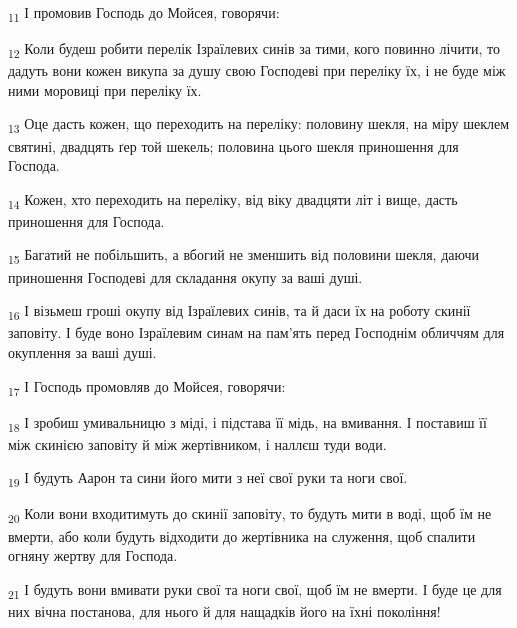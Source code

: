 \begin{tcolorbox}
\textsubscript{11} І промовив Господь до Мойсея, говорячи:
\end{tcolorbox}
\begin{tcolorbox}
\textsubscript{12} Коли будеш робити перелік Ізраїлевих синів за тими, кого повинно лічити, то дадуть вони кожен викупа за душу свою Господеві при переліку їх, і не буде між ними моровиці при переліку їх.
\end{tcolorbox}
\begin{tcolorbox}
\textsubscript{13} Оце дасть кожен, що переходить на переліку: половину шекля, на міру шеклем святині, двадцять ґер той шекель; половина цього шекля приношення для Господа.
\end{tcolorbox}
\begin{tcolorbox}
\textsubscript{14} Кожен, хто переходить на переліку, від віку двадцяти літ і вище, дасть приношення для Господа.
\end{tcolorbox}
\begin{tcolorbox}
\textsubscript{15} Багатий не побільшить, а вбогий не зменшить від половини шекля, даючи приношення Господеві для складання окупу за ваші душі.
\end{tcolorbox}
\begin{tcolorbox}
\textsubscript{16} І візьмеш гроші окупу від Ізраїлевих синів, та й даси їх на роботу скинії заповіту. І буде воно Ізраїлевим синам на пам'ять перед Господнім обличчям для окуплення за ваші душі.
\end{tcolorbox}
\begin{tcolorbox}
\textsubscript{17} І Господь промовляв до Мойсея, говорячи:
\end{tcolorbox}
\begin{tcolorbox}
\textsubscript{18} І зробиш умивальницю з міді, і підстава її мідь, на вмивання. І поставиш її між скинією заповіту й між жертівником, і наллєш туди води.
\end{tcolorbox}
\begin{tcolorbox}
\textsubscript{19} І будуть Аарон та сини його мити з неї свої руки та ноги свої.
\end{tcolorbox}
\begin{tcolorbox}
\textsubscript{20} Коли вони входитимуть до скинії заповіту, то будуть мити в воді, щоб їм не вмерти, або коли будуть відходити до жертівника на служення, щоб спалити огняну жертву для Господа.
\end{tcolorbox}
\begin{tcolorbox}
\textsubscript{21} І будуть вони вмивати руки свої та ноги свої, щоб їм не вмерти. І буде це для них вічна постанова, для нього й для нащадків його на їхні покоління!
\end{tcolorbox}
